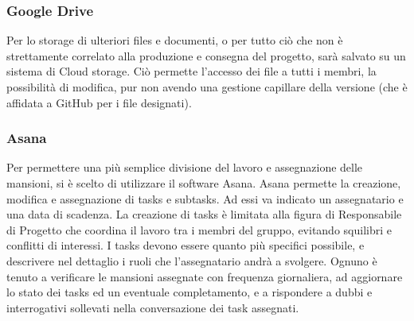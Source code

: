 \subsubsection{Google Drive}
Per lo storage di ulteriori files e documenti, o per tutto ciò che non è strettamente correlato alla produzione e consegna del progetto, sarà salvato su un sistema di Cloud storage. Ciò permette l'accesso dei file a tutti i membri, la possibilità di modifica, pur non avendo una gestione capillare della versione (che è affidata a GitHub per i file designati).

\subsubsection{Asana}
Per permettere una più semplice divisione del lavoro e assegnazione delle mansioni, si è scelto di utilizzare il software Asana. Asana permette la creazione, modifica e assegnazione di tasks e subtasks. Ad essi va indicato un assegnatario e una data di scadenza. La creazione di tasks è limitata alla figura di Responsabile di Progetto che coordina il lavoro tra i membri del gruppo, evitando squilibri e conflitti di interessi. I tasks devono essere quanto più specifici possibile, e descrivere nel dettaglio i ruoli che l'assegnatario andrà a svolgere. Ognuno è tenuto a verificare le mansioni assegnate con frequenza giornaliera, ad aggiornare lo stato dei tasks ed un eventuale completamento, e a rispondere a dubbi e interrogativi sollevati nella conversazione dei task assegnati.

